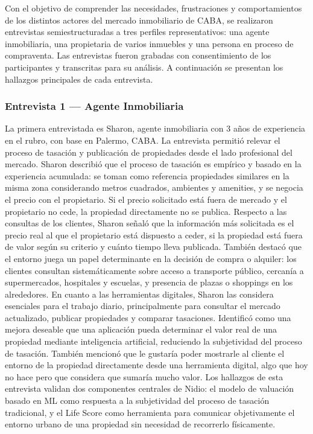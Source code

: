 Con el objetivo de comprender las necesidades, frustraciones y comportamientos de los distintos actores del mercado inmobiliario de CABA, se realizaron entrevistas semiestructuradas a tres perfiles representativos: una agente inmobiliaria, una propietaria de varios inmuebles y una persona en proceso de compraventa. Las entrevistas fueron grabadas con consentimiento de los participantes y transcritas para su análisis. A continuación se presentan los hallazgos principales de cada entrevista.

\subsubsection{Entrevista 1 --- Agente Inmobiliaria}

La primera entrevistada es Sharon, agente inmobiliaria con 3 años de experiencia en el rubro, con base en Palermo, CABA. La entrevista permitió relevar el proceso de tasación y publicación de propiedades desde el lado profesional del mercado. Sharon describió que el proceso de tasación es empírico y basado en la experiencia acumulada: se toman como referencia propiedades similares en la misma zona considerando metros cuadrados, ambientes y amenities, y se negocia el precio con el propietario. Si el precio solicitado está fuera de mercado y el propietario no cede, la propiedad directamente no se publica. Respecto a las consultas de los clientes, Sharon señaló que la información más solicitada es el precio real al que el propietario está dispuesto a ceder, si la propiedad está fuera de valor según su criterio y cuánto tiempo lleva publicada. También destacó que el entorno juega un papel determinante en la decisión de compra o alquiler: los clientes consultan sistemáticamente sobre acceso a transporte público, cercanía a supermercados, hospitales y escuelas, y presencia de plazas o shoppings en los alrededores. En cuanto a las herramientas digitales, Sharon las considera esenciales para el trabajo diario, principalmente para consultar el mercado actualizado, publicar propiedades y comparar tasaciones. Identificó como una mejora deseable que una aplicación pueda determinar el valor real de una propiedad mediante inteligencia artificial, reduciendo la subjetividad del proceso de tasación. También mencionó que le gustaría poder mostrarle al cliente el entorno de la propiedad directamente desde una herramienta digital, algo que hoy no hace pero que considera que sumaría mucho valor. Los hallazgos de esta entrevista validan dos componentes centrales de Nidio: el modelo de valuación basado en ML como respuesta a la subjetividad del proceso de tasación tradicional, y el Life Score como herramienta para comunicar objetivamente el entorno urbano de una propiedad sin necesidad de recorrerlo físicamente.

